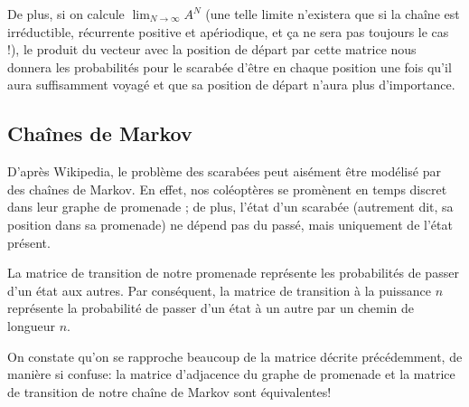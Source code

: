 \documentclass{scrartcl} \usepackage[utf8]{inputenc}
\begin{document}
  De plus, si on calcule $\lim_{N \to \infty} A^N$ (une telle limite
  n'existera que si la chaîne est irréductible, récurrente positive et
  apériodique, et ça ne sera pas toujours le cas !), le produit du
  vecteur avec la position de départ par cette matrice nous donnera
  les probabilités pour le scarabée d'être en chaque position une fois
  qu'il aura suffisamment voyagé et que sa position de départ n'aura
  plus d'importance.

  \subsection{Chaînes de Markov}

  D'après Wikipedia, le problème des scarabées peut aisément être
  modélisé par des chaînes de Markov. En effet, nos coléoptères se
  promènent en temps discret dans leur graphe de promenade ; de plus,
  l'état d'un scarabée (autrement dit, sa position dans sa promenade)
  ne dépend pas du passé, mais uniquement de l'état présent.

  La matrice de transition de notre promenade représente les
  probabilités de passer d'un état aux autres. Par conséquent, la
  matrice de transition à la puissance $n$ représente la probabilité
  de passer d'un état à un autre par un chemin de longueur $n$.

  On constate qu'on se rapproche beaucoup de la matrice décrite
  précédemment, de manière si confuse: la matrice d'adjacence du
  graphe de promenade et la matrice de transition de notre chaîne de
  Markov sont équivalentes!
\end{document}
